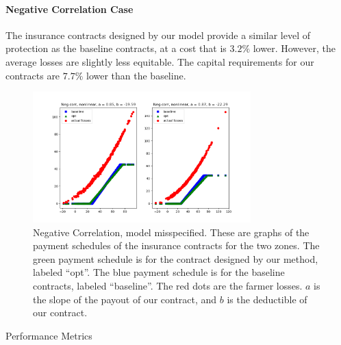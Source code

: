 \documentclass[11pt]{article}
\begin{document}
      \paragraph{Negative Correlation Case} The insurance contracts designed by our model provide a similar level of protection as the baseline contracts, at a cost that is $3.2\%$ lower. However, the average losses are slightly less equitable. The capital requirements for our contracts are $7.7\%$ lower than the baseline. 
      \begin{figure}[H]
          \centering
          \includegraphics[width=0.75\textwidth]{../../output/figures/Exploration/neg_correlation_nonlinear.png}
          \caption{Negative Correlation, model misspecified. These are graphs of the payment schedules of the insurance contracts for the two zones. The green payment schedule is for the contract designed by our method, labeled ``opt''. The blue payment schedule is for the baseline contracts, labeled ``baseline''. The red dots are the farmer losses. $a$ is the slope of the payout of our contract, and $b$ is the deductible of our contract.}
      \end{figure}

      \begin{table}[H]
          \centering
          \small
          \caption{Performance Metrics}
          
      \end{table}
      \FloatBarrier
    
\end{document}
